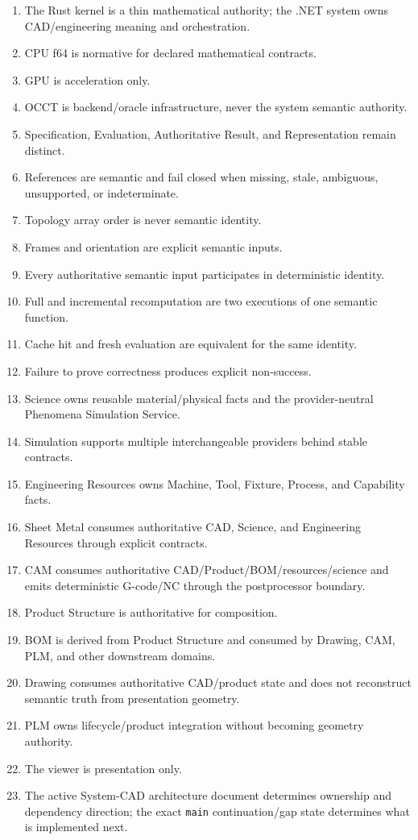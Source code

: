 \documentclass[11pt,a4paper]{report}
\begin{document}
\begin{enumerate}
\item The Rust kernel is a thin mathematical authority; the .NET system owns CAD/engineering meaning and orchestration.
\item CPU f64 is normative for declared mathematical contracts.
\item GPU is acceleration only.
\item OCCT is backend/oracle infrastructure, never the system semantic authority.
\item Specification, Evaluation, Authoritative Result, and Representation remain distinct.
\item References are semantic and fail closed when missing, stale, ambiguous, unsupported, or indeterminate.
\item Topology array order is never semantic identity.
\item Frames and orientation are explicit semantic inputs.
\item Every authoritative semantic input participates in deterministic identity.
\item Full and incremental recomputation are two executions of one semantic function.
\item Cache hit and fresh evaluation are equivalent for the same identity.
\item Failure to prove correctness produces explicit non-success.
\item Science owns reusable material/physical facts and the provider-neutral Phenomena Simulation Service.
\item Simulation supports multiple interchangeable providers behind stable contracts.
\item Engineering Resources owns Machine, Tool, Fixture, Process, and Capability facts.
\item Sheet Metal consumes authoritative CAD, Science, and Engineering Resources through explicit contracts.
\item CAM consumes authoritative CAD/Product/BOM/resources/science and emits deterministic G-code/NC through the postprocessor boundary.
\item Product Structure is authoritative for composition.
\item BOM is derived from Product Structure and consumed by Drawing, CAM, PLM, and other downstream domains.
\item Drawing consumes authoritative CAD/product state and does not reconstruct semantic truth from presentation geometry.
\item PLM owns lifecycle/product integration without becoming geometry authority.
\item The viewer is presentation only.
\item The active System-CAD architecture document determines ownership and dependency direction; the exact \texttt{main} continuation/gap state determines what is implemented next.
\end{enumerate}
\end{document}

